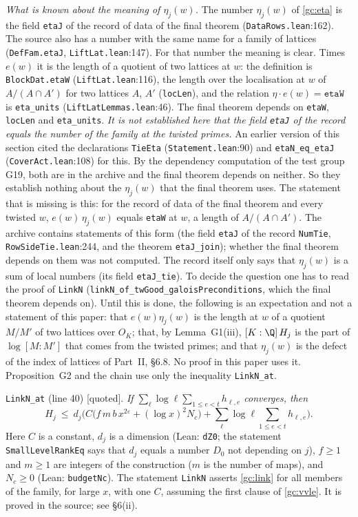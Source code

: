 \documentclass[11pt,letterpaper]{article}
\newcommand{\quoted}{\textsf{[quoted]}}
\begin{document}
\emph{What is known about the meaning of $\eta_j(w)$.} The number $\eta_j(w)$ of \eqref{gc:eta} is the
field \texttt{etaJ} of the record of data of the final theorem (\texttt{DataRows.lean}:162). The source
also has a number with the same name for a family of lattices (\texttt{DefFam.etaJ},
\texttt{LiftLat.lean}:147). For that number the meaning is clear. Times $e(w)$ it is the length of a
quotient of two lattices at $w$: the definition is \texttt{BlockDat.etaW} (\texttt{LiftLat.lean}:116), the
length over the localisation at $w$ of $A/(A\cap A')$ for two lattices $A$, $A'$ (\texttt{locLen}), and the
relation $\eta\cdot e(w)=\texttt{etaW}$ is \texttt{eta\_units} (\texttt{LiftLatLemmas.lean}:46). The final
theorem depends on \texttt{etaW}, \texttt{locLen} and \texttt{eta\_units}.
\emph{It is not established here that the field \texttt{etaJ} of the record equals the number of the
family at the twisted primes.} An earlier version of this section cited the declarations \texttt{TieEta}
(\texttt{Statement.lean}:90) and \texttt{etaN\_eq\_etaJ} (\texttt{CoverAct.lean}:108) for this. By the
dependency computation of the test group G19, both are in the archive and the final theorem depends on
neither. So they establish nothing about the $\eta_j(w)$ that the final theorem uses. The statement that
is missing is this: for the record of data of the final theorem and every twisted $w$,
$e(w)\,\eta_j(w)$ equals \texttt{etaW} at $w$, a length of $A/(A\cap A')$. The archive contains statements of this
form (the field \texttt{etaJ} of the record \texttt{NumTie}, \texttt{RowSideTie.lean}:244, and the theorem
\texttt{etaJ\_join}); whether the final theorem depends on them was not computed. The record itself only
says that $\eta_j(w)$ is a sum of local numbers (its field \texttt{etaJ\_tie}). To decide the question one
has to read the proof of \texttt{LinkN} (\texttt{linkN\_of\_twGood\_}\allowbreak\texttt{galoisPreconditions},
which the final theorem depends on). Until this is done, the following is an expectation and not a
statement of this paper: that $e(w)\eta_j(w)$ is the length at $w$ of a quotient $M/M'$ of two lattices over
$O_K$; that, by Lemma~G1(iii), $[K:\Q]\,H_j$ is the part of $\log[M:M']$ that comes from the twisted primes;
and that $\eta_j(w)$ is the defect of the index of lattices of Part~II, \S6.8. No proof in this paper uses
it. Proposition~G2 and the chain use only the inequality \texttt{LinkN\_at}.

\texttt{LinkN\_at} (line 40) \quoted. \emph{If $\sum_\ell\log\ell\sum_{1\le e<t}h_{\ell,e}$ converges, then}
\begin{equation}\label{gc:link}
 H_j\ \le\ d_j\Big(C\big(f\,m\,b\,x^{2\varepsilon}+(\log x)^2N_c\big)+\sum_{\ell}\log\ell\sum_{1\le e<t}h_{\ell,e}\Big).
\end{equation}
Here $C$ is a constant, $d_j$ is a dimension (Lean: \texttt{dZ0}; the statement \texttt{SmallLevelRankEq}
says that $d_j$ equals a number $D_0$ not depending on $j$), $f\ge1$ and $m\ge1$ are integers of the
construction ($m$ is the number of maps), and $N_c\ge0$ (Lean: \texttt{budgetNc}). The statement
\texttt{LinkN} asserts \eqref{gc:link} for all members of the family, for large $x$, with one $C$, assuming
the first clause of \eqref{gc:vvle}. It is proved in the source; see \S6(ii).
\end{document}
